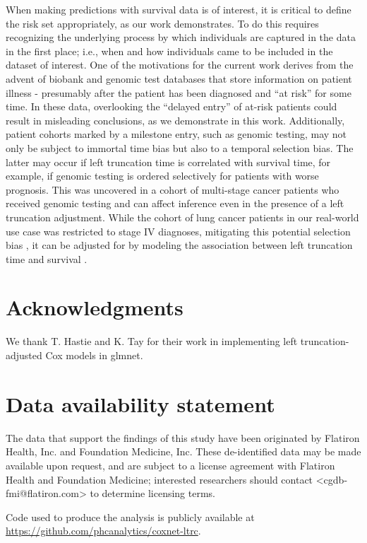 \documentclass[11pt,final,fleqn]{article}\usepackage[]{graphicx}\usepackage[]{color}
\theoremstyle{plain}
\newcommand{\pkg}[1]{{\fontseries{b}\selectfont #1}}
\begin{document}
When making predictions with survival data is of interest, it is critical to define the risk set appropriately, as our work demonstrates. To do this requires recognizing the underlying process by which individuals are captured in the data in the first place; i.e., when and how individuals came to be included in the dataset of interest. One of the motivations for the current work derives from the advent of biobank and genomic test databases that store information on patient illness - presumably after the patient has been diagnosed and ``at risk'' for some time. In these data, overlooking the ``delayed entry'' of at-risk patients could result in misleading conclusions, as we demonstrate in this work. Additionally, patient cohorts marked by a milestone entry, such as genomic testing, may not only be subject to immortal time bias but also to a temporal selection bias. The latter may occur if left truncation time is correlated with survival time, for example, if genomic testing is ordered selectively for patients with worse prognosis. This was uncovered in a cohort of multi-stage cancer patients who received genomic testing \cite{kehl2020selectionbias} and can affect inference even in the presence of a left truncation adjustment. While the cohort of lung cancer patients in our real-world use case was restricted to stage IV diagnoses, mitigating this potential selection bias \cite{kehl2020selectionbias}, it can be adjusted for by modeling the association between left truncation time and survival \cite{thiebaut2004choice, chiou2019transformation}.

\section*{Acknowledgments} 
We thank T. Hastie and K. Tay for their work in implementing left truncation-adjusted Cox models in \pkg{glmnet}. 

\section*{Data availability statement}
The data that support the findings of this study have been originated by Flatiron Health, Inc. and Foundation Medicine, Inc. These de-identified data may be made available upon request, and are subject to a license agreement with Flatiron Health and Foundation Medicine; interested researchers should contact <cgdb-fmi@flatiron.com> to determine licensing terms.

Code used to produce the analysis is publicly available at \url{https://github.com/phcanalytics/coxnet-ltrc}.


\end{document}
